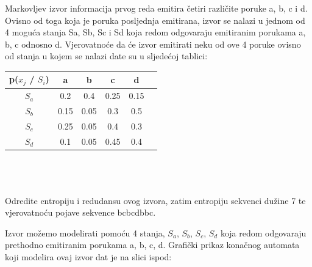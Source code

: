 \documentclass[12pt]{article}
\begin{document}
\begin{enumerate}
Markovljev izvor informacija prvog reda emitira četiri različite poruke a, b, c i d. Ovisno od toga koja je poruka posljednja emitirana, izvor se nalazi u jednom od 4 moguća stanja Sa, Sb, Sc i Sd koja redom odgovaraju emitiranim porukama a, b, c odnosno d. Vjerovatnoće da će izvor emitirati neku od ove 4 poruke ovisno od stanja u kojem se nalazi date su u sljedećoj tablici: \\

\begin{tabular}{|c|c|c|c|c|c|}
\hline
p(${x_j}$ / ${S_i}$) & a    & b    & c    & d    \\ \hline
${S_a}$        & 0.2  & 0.4  & 0.25  & 0.15  \\ \hline
${S_b}$        & 0.15 & 0.05 & 0.3 & 0.5 \\ \hline
${S_c}$        & 0.25 & 0.05  & 0.4 & 0.3  \\ \hline
${S_d}$        & 0.1 & 0.05 & 0.45  & 0.4  \\ \hline
\end{tabular} \\
\\
\\
Odredite entropiju i redudansu ovog izvora, zatim entropiju sekvenci dužine 7 te vjerovatnoću pojave sekvence bcbcdbbc.

\vspace{0.5cm}
Izvor možemo modelirati pomoću 4 stanja,
$S_a$, $S_b$, $S_c$, $S_d$ koja redom odgovaraju prethodno emitiranim porukama a, b, c, d. 
Grafički prikaz konačnog automata koji modelira ovaj izvor dat je na slici
ispod:	\\
\\
\end{enumerate}
\end{document}
